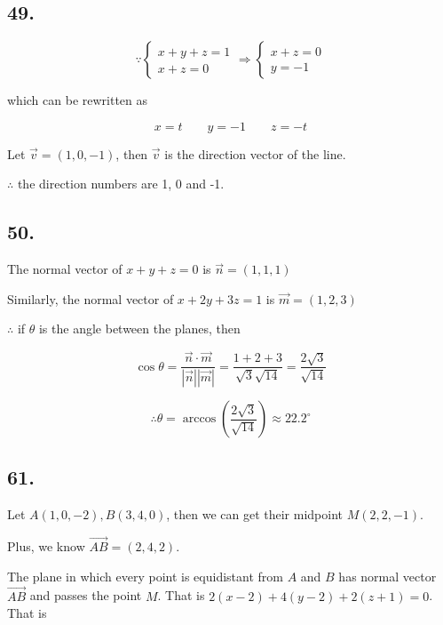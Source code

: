 \documentclass{article}
\begin{document}
    \subsection*{49.}

    $$\because \left\{ \begin{array}{ll} x + y + z = 1 \\ x + z = 0 \end{array}\right. \Rightarrow \left\{ \begin{array}{ll} x+z=0 \\ y=-1 \end{array}\right.$$

    which can be rewritten as

    $$x = t \qquad y = -1 \qquad z = -t$$

    Let $\overrightarrow{v} = (1, 0, -1)$, then $\overrightarrow{v}$ is the direction vector of the line.

    $\therefore$ the direction numbers are 1, 0 and -1.

    \subsection*{50.}

    The normal vector of $x+y+z=0$ is $\overrightarrow{n} = (1, 1, 1)$

    Similarly, the normal vector of $x+2y+3z=1$ is $\overrightarrow{m} = (1, 2, 3)$

    $\therefore $ if $\theta$ is the angle between the planes, then
    
    $$\cos \theta = \frac{\overrightarrow{n} \cdot \overrightarrow{m}}{|\overrightarrow{n}| |\overrightarrow{m}|} = \frac{1 + 2 + 3}{\sqrt{3}\sqrt{14}} = \frac{2\sqrt 3}{\sqrt{14}}$$

    $$\therefore \theta = \arccos(\frac{2\sqrt 3}{\sqrt{14}}) \approx 22.2^\circ$$

    \subsection*{61.}

    Let $A(1, 0, -2), B(3, 4, 0)$, then we can get their midpoint $M(2, 2, -1)$.

    Plus, we know $\overrightarrow{AB} = (2, 4, 2)$.

    The plane in which every point is equidistant from $A$ and $B$ has normal vector $\overrightarrow{AB}$ and passes the point $M$. That is $2(x-2) + 4(y-2) + 2(z+1) = 0$. That is
\end{document}
